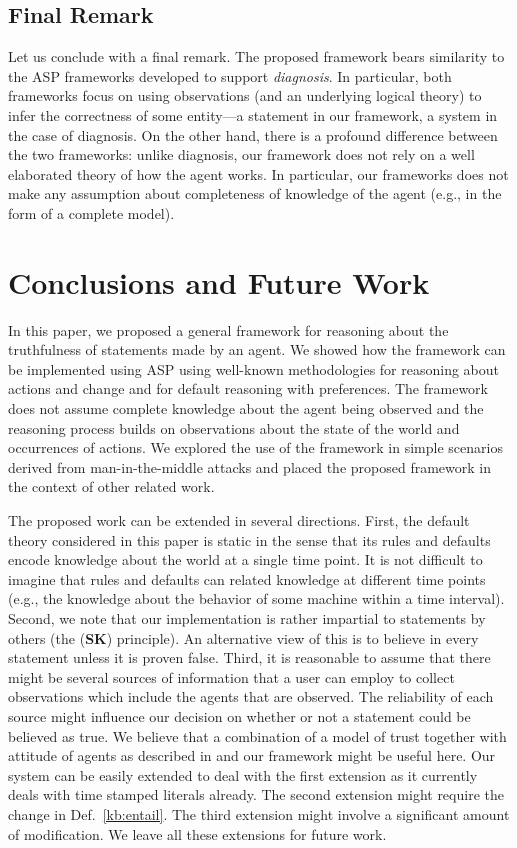 \documentclass{article}
\begin{document}

\subsection{Final Remark}
Let us conclude with a final remark. 
 The proposed framework bears  similarity  to the ASP frameworks developed to
 support \emph{diagnosis}. In particular, both frameworks  focus on using observations (and an underlying logical theory) to infer the correctness of some entity---a statement in our framework, a system in the case of diagnosis. 
 On the other hand, there is a profound difference between the two frameworks: unlike diagnosis, our 
 framework does  not rely on  a well elaborated theory of how the agent works. In particular, our frameworks 
 does not make any assumption about completeness of knowledge of the agent (e.g., in the form of a complete
 model).
  \fi 
   
 \section{Conclusions and Future Work}
In this paper, we proposed a general framework for reasoning about the truthfulness of statements
made by an agent. We showed how the framework can be implemented using ASP using well-known methodologies for reasoning about actions and change and for default reasoning with preferences. The framework does not assume complete knowledge about the agent being observed and the reasoning 
process builds on observations about the state of the world and occurrences of actions. We explored the use of the
framework in simple scenarios derived from man-in-the-middle attacks and  placed the proposed framework in the context of other related work.


The proposed work can be extended in several directions. First, the default theory considered in this paper is static in the sense that its rules and defaults encode knowledge about the world at a single time point. It is not difficult to imagine that rules and defaults can related knowledge at different time points (e.g., the knowledge about the behavior of some machine within a time interval). 
Second, we note that our implementation is rather impartial to statements by others (the ({\bf SK}) principle). An alternative view of this is to believe in every statement unless it is proven false. Third, it is reasonable to assume that there might be several sources of information that a user can employ to collect observations which include the agents that are observed. The reliability of each source might influence our decision on whether or not a statement could be believed as true. We believe that a combination of a model of trust together with attitude of agents as described in \cite{SabaterS05,ArtzG07} and our framework might be useful here. 
Our  system can be easily extended to deal with the first extension 
as it currently deals with time stamped literals already. The second extension might require the change in Def.~\ref{kb:entail}. The third extension might involve a significant amount of modification. We leave all these extensions for future work.  





\end{document}
